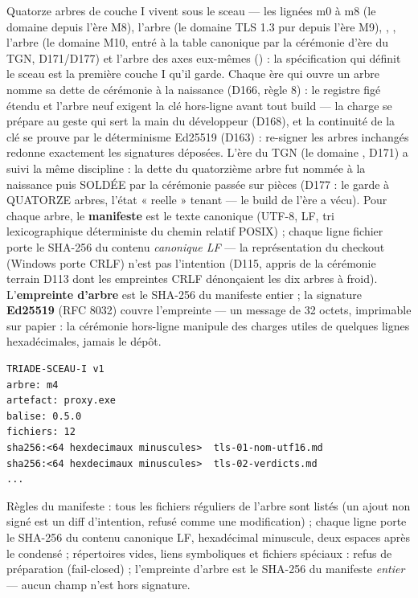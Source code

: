 Quatorze arbres de couche I vivent sous le sceau — les lignées m0 à m8 (le domaine
 depuis l'ère M8), l'arbre  (le domaine TLS 1.3 pur depuis
l'ère M9), , , l'arbre  (le domaine M10, entré
à la table canonique par la cérémonie d'ère du TGN, D171/D177) et l'arbre des axes
eux-mêmes () : la spécification qui définit le sceau est la première couche I
qu'il garde. Chaque ère qui ouvre un arbre nomme sa dette de cérémonie à la
naissance (D166, règle 8) : le registre figé étendu et l'arbre neuf exigent la clé
hors-ligne avant tout build — la charge se prépare au geste qui sert la main du
développeur (D168), et la continuité de la clé se prouve par le déterminisme
Ed25519 (D163) : re-signer les arbres inchangés redonne exactement les signatures
déposées. L'ère du TGN (le domaine , D171) a suivi la même discipline :
la dette du quatorzième arbre fut nommée à la naissance puis SOLDÉE par la cérémonie
passée sur pièces (D177 : le garde à QUATORZE arbres, l'état « reelle » tenant — le
build de l'ère a vécu). Pour chaque arbre,
le \textbf{manifeste} est le texte
canonique (UTF-8, LF, tri lexicographique déterministe du chemin relatif POSIX) ; chaque
ligne fichier porte le SHA-256 du contenu \emph{canonique LF} — la représentation du
checkout (Windows  porte CRLF) n'est pas l'intention (D115, appris de la
cérémonie terrain D113 dont les empreintes CRLF dénonçaient les dix arbres à froid).
L'\textbf{empreinte d'arbre} est le SHA-256 du manifeste entier ; la signature
\textbf{Ed25519} (RFC 8032) couvre l'empreinte — un message de 32 octets, imprimable
sur papier : la cérémonie hors-ligne manipule des charges utiles de quelques lignes
hexadécimales, jamais le dépôt.

\begin{lstlisting}
TRIADE-SCEAU-I v1
arbre: m4
artefact: proxy.exe
balise: 0.5.0
fichiers: 12
sha256:<64 hexdecimaux minuscules>  tls-01-nom-utf16.md
sha256:<64 hexdecimaux minuscules>  tls-02-verdicts.md
...
\end{lstlisting}

Règles du manifeste : tous les fichiers réguliers de l'arbre sont listés (un ajout non
signé est un diff d'intention, refusé comme une modification) ; chaque ligne porte le
SHA-256 du contenu canonique LF, hexadécimal minuscule, deux espaces après le condensé ;
répertoires vides, liens symboliques et fichiers spéciaux : refus de préparation
(fail-closed) ; l'empreinte d'arbre est le SHA-256 du manifeste \emph{entier} — aucun
champ n'est hors signature.

